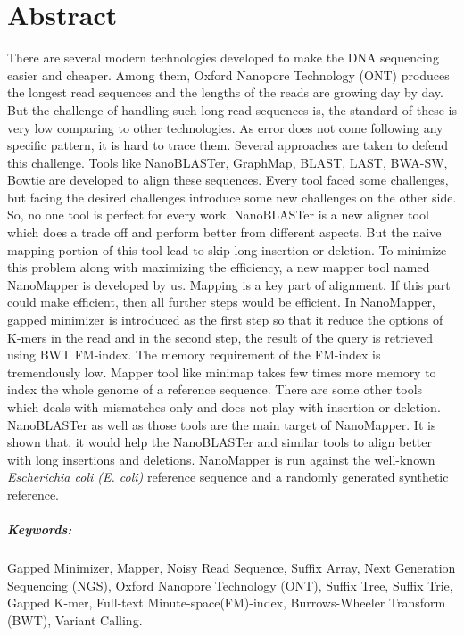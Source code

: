 \documentclass{standalone}
\begin{document}
\chapter*{Abstract}

There are several modern technologies developed to make the DNA sequencing easier and cheaper. Among them, Oxford Nanopore Technology (ONT) produces the longest read sequences and the lengths of the reads are growing day by day. But the challenge of handling such long read sequences is, the standard of these is very low comparing to other technologies. As error does not come following any specific pattern, it is hard to trace them. Several approaches are taken to defend this challenge.  Tools like NanoBLASTer, GraphMap, BLAST, LAST, BWA-SW, Bowtie are developed to align these sequences. Every tool faced some challenges, but facing the desired challenges introduce some new challenges on the other side. So, no one tool is perfect for every work. NanoBLASTer is a new aligner tool which does a trade off and perform better from different aspects. But the naive mapping portion of this tool lead to skip long insertion or deletion. To minimize this problem along with maximizing the efficiency, a new mapper tool named NanoMapper is developed by us. Mapping is a key part of alignment. If this part could make efficient, then all further steps would be efficient. In NanoMapper, gapped minimizer is introduced as the first step so that it reduce the options of K-mers in the read and in the second step, the result of the query is retrieved using BWT FM-index. The memory requirement of the FM-index is tremendously low. Mapper tool like minimap takes few times more memory to index the whole genome of a reference sequence. There are some other tools which deals with mismatches only and does not play with insertion or deletion. NanoBLASTer as well as those tools are the main target of NanoMapper. It is shown that, it would help the NanoBLASTer and similar tools to align better with long insertions and deletions. NanoMapper is run against the well-known \emph{Escherichia coli (E. coli)} reference sequence and a randomly generated synthetic reference.
\clearpage
\paragraph*{Keywords:}  Gapped Minimizer, Mapper, Noisy Read Sequence, Suffix Array, Next Generation Sequencing (NGS), Oxford Nanopore Technology (ONT), Suffix Tree, Suffix Trie, Gapped K-mer, Full-text Minute-space(FM)-index, Burrows-Wheeler Transform (BWT), Variant Calling.
\end{document}
